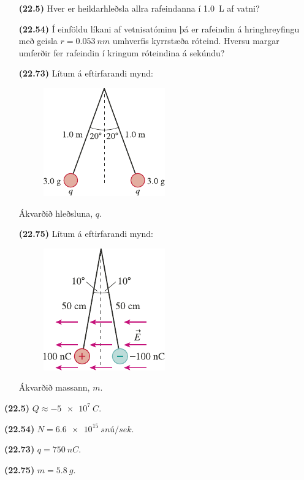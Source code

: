 \begin{enumerate}[label = \textbf{(\alph*)}]

\item[\textbf{(22.5)}] Hver er heildarhleðsla allra rafeindanna í \SI{1.0}{L} af vatni?

\item[\textbf{(22.54)}] Í einföldu líkani af vetnisatóminu þá er rafeindin á hringhreyfingu með geisla $r = \SI{0.053}{nm}$ umhverfis kyrrstæða róteind. Hversu margar umferðir fer rafeindin í kringum róteindina á sekúndu?

\item[\textbf{(22.73)}] Lítum á eftirfarandi mynd:

\begin{figure}[H]
    \centering
    \includegraphics{figures/rk2273.pdf}
\end{figure}

Ákvarðið hleðsluna, $q$.

\item[\textbf{(22.75)}] Lítum á eftirfarandi mynd:

\begin{figure}[H]
    \centering
    \includegraphics{figures/rk2275.pdf}
\end{figure}

Ákvarðið massann, $m$.

\end{enumerate}

\begin{tcolorbox}
\begin{enumerate*}[label = \vspace{0.15cm} ]
  \item \textbf{(22.5)} $Q \approx \SI{-5e7}{C}$.
  \item \textbf{(22.54)} $N = \SI{6.6e15}{snú/sek}$.
  \item \textbf{(22.73)} $q = \SI{750}{nC}$.
  \item \textbf{(22.75)} $m = \SI{5.8}{g}$.
\end{enumerate*}
\end{tcolorbox}

\newpage

